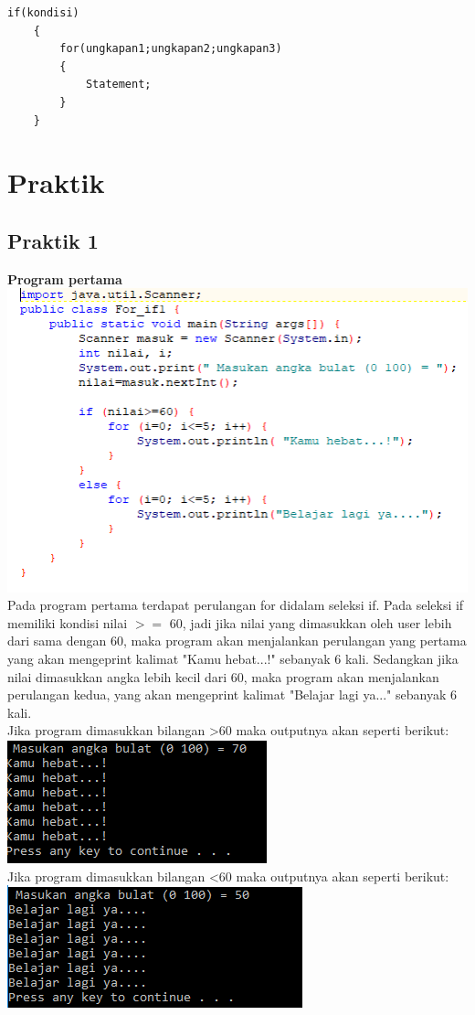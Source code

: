\documentclass[a4paper,12pt]{article}
\begin{document}
\begin{lstlisting}[frame=single]
    if(kondisi)
    {
        for(ungkapan1;ungkapan2;ungkapan3)
        {
            Statement;
        }
    }
\end{lstlisting}

\section{Praktik}
\subsection{Praktik 1}
\textbf{Program pertama}\\
\includegraphics{img1.PNG}\\
Pada program pertama terdapat perulangan for didalam seleksi if.  Pada seleksi if memiliki kondisi nilai $>=$ 60, jadi jika nilai yang dimasukkan oleh user lebih dari sama dengan 60, maka program akan menjalankan perulangan yang pertama yang akan mengeprint kalimat "Kamu hebat...!" sebanyak 6 kali. Sedangkan jika nilai dimasukkan angka lebih kecil dari 60, maka program akan menjalankan perulangan kedua, yang akan mengeprint kalimat "Belajar lagi ya..." sebanyak 6 kali.\\
Jika program dimasukkan bilangan >60 maka outputnya akan seperti berikut:\\
\includegraphics{img2.PNG}\\
\newpage 
Jika program dimasukkan bilangan <60 maka outputnya akan seperti berikut:\\
\includegraphics{img3.PNG}\\[4ex]
\end{document}
